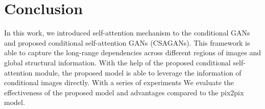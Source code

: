 \section{Conclusion}
\label{sec:conclusion}
In this work, we introduced self-attention mechanism to the conditional GANs and proposed conditional self-attention GANs (CSAGANs). This framework is able to capture the long-range dependencies across different regions of images and global structural information. With the help of the proposed conditional self-attention module, the proposed model is able to leverage the information of conditional images directly. With a series of experiments We evaluate the effectiveness of the proposed model and advantages compared to the pix2pix model.